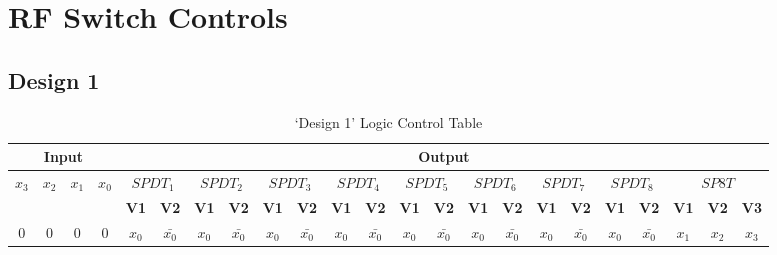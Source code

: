 \documentclass[12pt,openany,a4paper]{book}
\begin{document}
\chapter{RF Switch Controls}		\label{app:logic-control}
\begin{landscape}
\section{Design 1}	\label{sec:logic_design1}
\begin{table}[H]
  \centering
  \caption{`Design 1' Logic Control Table}
    \begin{tabular}{|cccc|ccccccccccccccccccc|}
    \hline
    \multicolumn{4}{|c|}{\textbf{Input}} & \multicolumn{19}{c|}{\textbf{Output}} \\
    \hline
    \multicolumn{1}{|c|}{\multirow{2}[4]{*}{\boldmath{}\textbf{$x_3$}\unboldmath{}}} & \multicolumn{1}{c|}{\multirow{2}[4]{*}{\boldmath{}\textbf{$x_2$}\unboldmath{}}} & \multicolumn{1}{c|}{\multirow{2}[4]{*}{\boldmath{}\textbf{$x_1$}\unboldmath{}}} & \multirow{2}[4]{*}{\boldmath{}\textbf{$x_0$}\unboldmath{}} & \multicolumn{2}{c|}{\textbf{$SPDT_1$}} & \multicolumn{2}{c|}{\textbf{$SPDT_2$}} & \multicolumn{2}{c|}{\textbf{$SPDT_3$}} & \multicolumn{2}{c|}{\textbf{$SPDT_4$}} & \multicolumn{2}{c|}{\textbf{$SPDT_5$}} & \multicolumn{2}{c|}{\textbf{$SPDT_6$}} & \multicolumn{2}{c|}{\textbf{$SPDT_7$}} & \multicolumn{2}{c|}{\textbf{$SPDT_8$}} & \multicolumn{3}{c|}{\textbf{$SP8T$}} \\
\cline{5-23}    \multicolumn{1}{|c|}{} & \multicolumn{1}{c|}{} & \multicolumn{1}{c|}{} &       & \multicolumn{1}{c|}{\textbf{V1}} & \multicolumn{1}{c|}{\textbf{V2}} & \multicolumn{1}{c|}{\textbf{V1}} & \multicolumn{1}{c|}{\textbf{V2}} & \multicolumn{1}{c|}{\textbf{V1}} & \multicolumn{1}{c|}{\textbf{V2}} & \multicolumn{1}{c|}{\textbf{V1}} & \multicolumn{1}{c|}{\textbf{V2}} & \multicolumn{1}{c|}{\textbf{V1}} & \multicolumn{1}{c|}{\textbf{V2}} & \multicolumn{1}{c|}{\textbf{V1}} & \multicolumn{1}{c|}{\textbf{V2}} & \multicolumn{1}{c|}{\textbf{V1}} & \multicolumn{1}{c|}{\textbf{V2}} & \multicolumn{1}{c|}{\textbf{V1}} & \multicolumn{1}{c|}{\textbf{V2}} & \multicolumn{1}{c|}{\textbf{V1}} & \multicolumn{1}{c|}{\textbf{V2}} & \textbf{V3} \\
    \hline
    0     & 0     & 0     & 0     & $x_0$ & $\bar{x_0}$ & $x_0$ & $\bar{x_0}$ & $x_0$ & $\bar{x_0}$ & $x_0$ & $\bar{x_0}$ & $x_0$ & $\bar{x_0}$ & $x_0$ & $\bar{x_0}$ & $x_0$ & $\bar{x_0}$ & $x_0$ & $\bar{x_0}$ & $x_1$ & $x_2$ & $x_3$ \\

\end{tabular}
\end{table}
\end{landscape}
\end{document}
